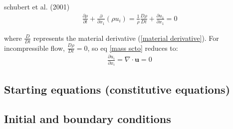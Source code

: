 \documentclass[document.tex]{subfiles}
\begin{document}
schubert et al. (2001) \cite{scto01}
\begin{align} \label{mass scto}
\frac{\partial \rho}{\partial t} + \frac{\partial}{\partial x_1}(\rho u_i) = \frac{1}{\rho}\frac{D\rho}{Dt} + \frac{\partial u_1}{\partial x_1} = 0
\end{align}

where $\frac{D}{Dt}$ represents the material derivative (\ref{material derivative}). For incompressible flow, $\frac{D\rho}{Dt} = 0$, so eq \ref{mass scto} reduces to: 
\begin{align}
\frac{\partial u_i}{\partial x_i} = \nabla \cdot \textbf{u} =0
\end{align}

\subsection{Starting equations (constitutive equations)}

\subsection{Initial and boundary conditions}
\end{document}
